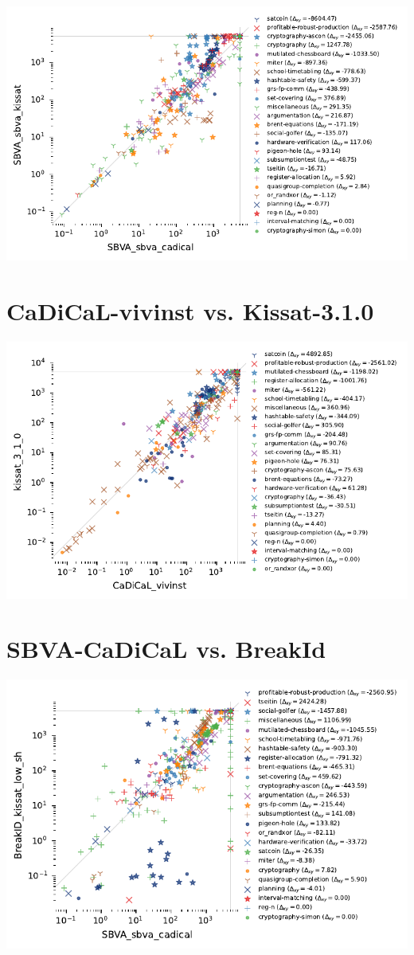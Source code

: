 \documentclass{article}
\begin{document}
\includegraphics{gen/sc2023/sbva_cadical_kissat_logscale.pdf}

\section{CaDiCaL-vivinst vs. Kissat-3.1.0}


\includegraphics{gen/sc2023/Cadical_vivinst_Kissat_310_logscale.pdf}

\section{SBVA-CaDiCaL vs. BreakId}


\includegraphics{gen/sc2023/sbva_cadical_breakid_logscale.pdf}
\end{document}
